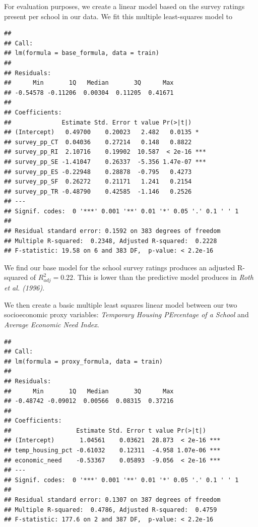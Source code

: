 \documentclass[
  man]{apa6}
\begin{document}
For evaluation purposes, we create a linear model based on the survey ratings present per school in our data. We fit this multiple least-squares model to

\begin{verbatim}
## 
## Call:
## lm(formula = base_formula, data = train)
## 
## Residuals:
##      Min       1Q   Median       3Q      Max 
## -0.54578 -0.11206  0.00304  0.11205  0.41671 
## 
## Coefficients:
##              Estimate Std. Error t value Pr(>|t|)    
## (Intercept)   0.49700    0.20023   2.482   0.0135 *  
## survey_pp_CT  0.04036    0.27214   0.148   0.8822    
## survey_pp_RI  2.10716    0.19902  10.587  < 2e-16 ***
## survey_pp_SE -1.41047    0.26337  -5.356 1.47e-07 ***
## survey_pp_ES -0.22948    0.28878  -0.795   0.4273    
## survey_pp_SF  0.26272    0.21171   1.241   0.2154    
## survey_pp_TR -0.48790    0.42585  -1.146   0.2526    
## ---
## Signif. codes:  0 '***' 0.001 '**' 0.01 '*' 0.05 '.' 0.1 ' ' 1
## 
## Residual standard error: 0.1592 on 383 degrees of freedom
## Multiple R-squared:  0.2348, Adjusted R-squared:  0.2228 
## F-statistic: 19.58 on 6 and 383 DF,  p-value: < 2.2e-16
\end{verbatim}

We find our base model for the school survey ratings produces an adjusted R-squared of \(R^2_{adj} = 0.22\). This is lower than the predictive model produces in \emph{Roth et al. (1996)}.

We then create a basic multiple least squares linear model between our two socioeconomic proxy variables: \emph{Temporary Housing PErcentage of a School} and \emph{Average Economic Need Index}.

\begin{verbatim}
## 
## Call:
## lm(formula = proxy_formula, data = train)
## 
## Residuals:
##      Min       1Q   Median       3Q      Max 
## -0.48742 -0.09012  0.00566  0.08315  0.37216 
## 
## Coefficients:
##                  Estimate Std. Error t value Pr(>|t|)    
## (Intercept)       1.04561    0.03621  28.873  < 2e-16 ***
## temp_housing_pct -0.61032    0.12311  -4.958 1.07e-06 ***
## economic_need    -0.53367    0.05893  -9.056  < 2e-16 ***
## ---
## Signif. codes:  0 '***' 0.001 '**' 0.01 '*' 0.05 '.' 0.1 ' ' 1
## 
## Residual standard error: 0.1307 on 387 degrees of freedom
## Multiple R-squared:  0.4786, Adjusted R-squared:  0.4759 
## F-statistic: 177.6 on 2 and 387 DF,  p-value: < 2.2e-16
\end{verbatim}
\end{document}
